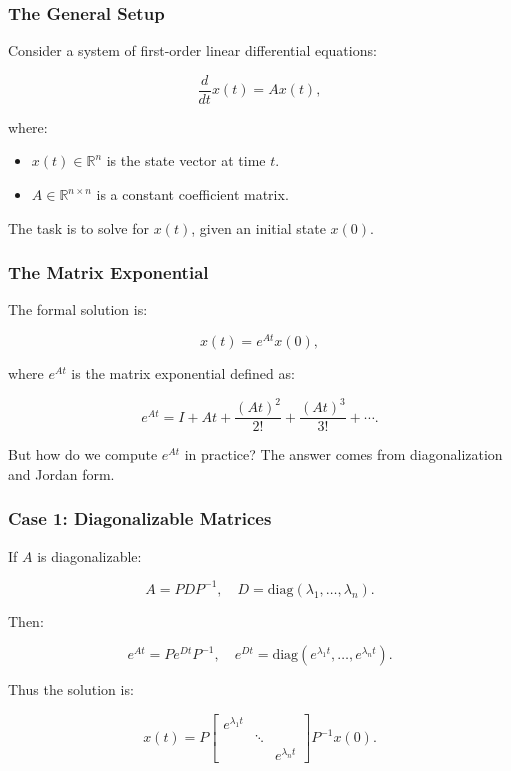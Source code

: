 \documentclass[
  letterpaper,
  DIV=11,
  numbers=noendperiod]{scrreprt}
\providecommand{\tightlist}{%
  \setlength{\itemsep}{0pt}\setlength{\parskip}{0pt}}
\begin{document}
\subsubsection{The General Setup}\label{the-general-setup}

Consider a system of first-order linear differential equations:

\[
\frac{d}{dt}x(t) = A x(t),
\]

where:

\begin{itemize}
\tightlist
\item
  \(x(t) \in \mathbb{R}^n\) is the state vector at time \(t\).
\item
  \(A \in \mathbb{R}^{n \times n}\) is a constant coefficient matrix.
\end{itemize}

The task is to solve for \(x(t)\), given an initial state \(x(0)\).

\subsubsection{The Matrix Exponential}\label{the-matrix-exponential}

The formal solution is:

\[
x(t) = e^{At} x(0),
\]

where \(e^{At}\) is the matrix exponential defined as:

\[
e^{At} = I + At + \frac{(At)^2}{2!} + \frac{(At)^3}{3!} + \cdots.
\]

But how do we compute \(e^{At}\) in practice? The answer comes from
diagonalization and Jordan form.

\subsubsection{Case 1: Diagonalizable
Matrices}\label{case-1-diagonalizable-matrices}

If \(A\) is diagonalizable:

\[
A = P D P^{-1}, \quad D = \text{diag}(\lambda_1, \ldots, \lambda_n).
\]

Then:

\[
e^{At} = P e^{Dt} P^{-1}, \quad e^{Dt} = \text{diag}(e^{\lambda_1 t}, \ldots, e^{\lambda_n t}).
\]

Thus the solution is:

\[
x(t) = P \begin{bmatrix} e^{\lambda_1 t} & & \\ & \ddots & \\ & & e^{\lambda_n t} \end{bmatrix} P^{-1} x(0).
\]
\end{document}
